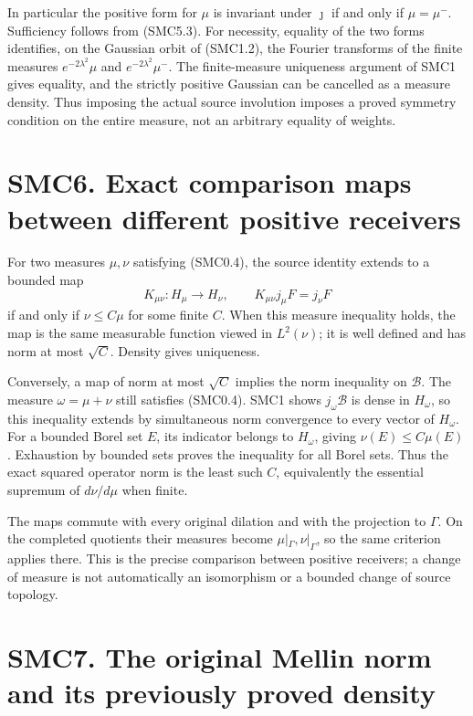 In particular the positive form for \(\mu\) is invariant under
\(\jmath\) if and only if \(\mu=\mu^-\). Sufficiency follows from
(SMC5.3). For necessity, equality of the two forms identifies, on the
Gaussian orbit of (SMC1.2), the Fourier transforms of the finite
measures \(e^{-2\lambda^2}\mu\) and \(e^{-2\lambda^2}\mu^-\). The
finite-measure uniqueness argument of SMC1 gives equality, and the
strictly positive Gaussian can be cancelled as a measure density. Thus
imposing the actual source involution imposes a proved symmetry
condition on the entire measure, not an arbitrary equality of weights.

\section{SMC6. Exact comparison maps between different positive
receivers}\label{smc6.-exact-comparison-maps-between-different-positive-receivers}

For two measures \(\mu,\nu\) satisfying (SMC0.4), the source identity
extends to a bounded map \[
K_{\mu\nu}:H_\mu\longrightarrow H_\nu,
\qquad K_{\mu\nu}j_\mu F=j_\nu F
\tag{SMC6.1}
\] if and only if \(\nu\le C\mu\) for some finite \(C\). When this
measure inequality holds, the map is the same measurable function viewed
in \(L^2(\nu)\); it is well defined and has norm at most \(\sqrt C\).
Density gives uniqueness.

Conversely, a map of norm at most \(\sqrt C\) implies the norm
inequality on \(\mathcal B\). The measure \(\omega=\mu+\nu\) still
satisfies (SMC0.4). SMC1 shows \(j_\omega\mathcal B\) is dense in
\(H_\omega\), so this inequality extends by simultaneous norm
convergence to every vector of \(H_\omega\). For a bounded Borel set
\(E\), its indicator belongs to \(H_\omega\), giving
\(\nu(E)\le C\mu(E)\). Exhaustion by bounded sets proves the inequality
for all Borel sets. Thus the exact squared operator norm is the least
such \(C\), equivalently the essential supremum of \(d\nu/d\mu\) when
finite.

The maps commute with every original dilation and with the projection to
\(\Gamma\). On the completed quotients their measures become
\(\mu|_\Gamma,\nu|_\Gamma\), so the same criterion applies there. This
is the precise comparison between positive receivers; a change of
measure is not automatically an isomorphism or a bounded change of
source topology.

\section{SMC7. The original Mellin norm and its previously proved
density}\label{smc7.-the-original-mellin-norm-and-its-previously-proved-density}

